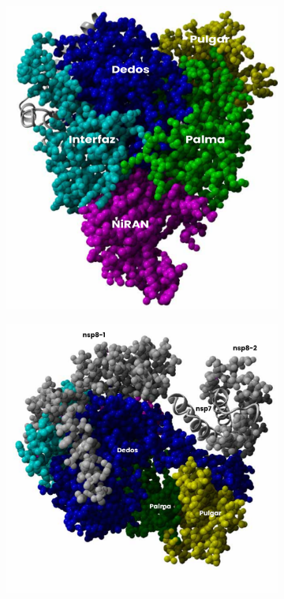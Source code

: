 \documentclass[a4paper,11pt]{report}
\begin{document}
  \begin{figure}[h!]
 	\centering
 	\begin{subfigure}[h]{0.45\textwidth}
 		\includegraphics[width=\linewidth]{Figuras/Figura4}
 		\caption{}
 		
 	\end{subfigure}
 \begin{subfigure}[h]{0.45\textwidth}
 	\includegraphics[width=1.2\linewidth]{Figuras/Figura6}
 	\caption{ }
 	

\end{subfigure}
\end{figure}
\end{document}
